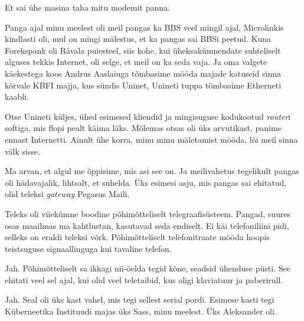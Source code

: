 
Et sai ühe masina taha  mitu modemit panna.


Panga ajal minu meelest oli meil pangas ka BBS veel mingil ajal, 
Microlinkis kindlasti oli, mul on mingi mälestus, et ka pangas 
sai BBSi peetud. Kuna Forekspank oli Rävala puiesteel, siis  kohe, kui 
üheksakümnendate suhteliselt alguses tekkis Internet, oli selge, et meil on ka 
seda vaja. Ja oma valgete käekestega koos Andrus Aaslaiuga tõmbasime mööda majade katuseid sinna kõrvale KBFI majja, 
kus sündis Uninet, Unineti tuppa tõmbasime Etherneti kaabli.

Otse Unineti küljes, ühed esimesed kliendid ja mingisuguse kodukootud 
\emph{router}i softiga, mis flopi pealt käima läks. Mõlemas otsas oli üks 
arvutikast, panime ennast Internetti. Ainult ühe korra, minu minu mäletamist 
mööda, lõi meil sinna välk sisse.


Ma arvan, et algul me õppisime, mis asi see on. Ja meilivahetus tegelikult 
pangas oli hädavajalik, lihtsalt, et  suhelda. Üks esimesi asju, mis pangas sai 
ehitatud, olid teleksi \emph{gateway} Pegasus Maili. 


Teleks oli viiekümne boodine põhimõtteliselt telegraafisüsteem. Pangad, suures 
osas maailmas ma kahtlustan, kasutavad seda endiselt. Ei käi telefoniliini 
pidi, selleks on eraldi teleksi võrk. Põhimõtteliselt telefonitraate mööda 
hoopis teistsuguse signaallinguga kui tavaline telefon.


Jah. Põhimõtteliselt sa ikkagi  nii-öelda tegid kõne, seadsid ühenduse püsti. 
See ehitati veel sel ajal, kui olid veel  teletaibid, kus oligi klaviatuur ja 
paberirull.


Jah. Seal oli üks kast vahel, mis tegi sellest serial pordi. Esimese kasti tegi 
Küberneetika Instituudi majas üks Sass, minu 
meelest. Üks Aleksander oli.

